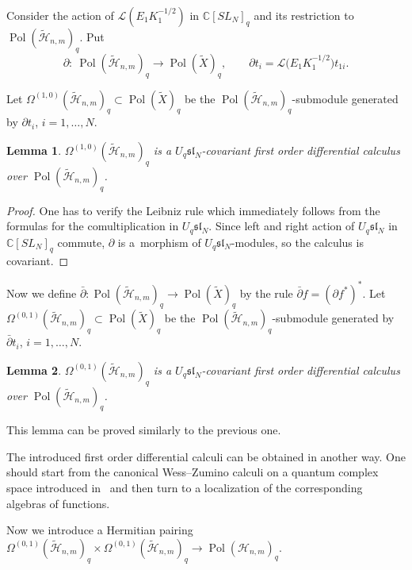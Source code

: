 \documentclass[11pt]{article}
\newtheorem{lemma}{Lemma}
\begin{document}
Consider the action of $\mathcal{L}(E_1K_1^{-1/2})$ in $\mathbb C [SL_N]_q$ and its restriction to
$\operatorname{Pol}(\widetilde{\mathscr{H}}_{n,m})_q$. Put
\[\partial: \
\operatorname{Pol}(\widetilde{\mathscr{H}}_{n,m})_q \rightarrow \operatorname{Pol}(\widetilde{X})_q, \qquad \partial
t_i=\mathcal{L}\big(E_1K_1^{-1/2}\big)t_{1i}.
\]

Let $\Omega^{(1,0)}(\widetilde{\mathscr{H}}_{n,m})_q \subset \operatorname{Pol}(\widetilde{X})_q$ be the
$\operatorname{Pol}(\widetilde{\mathscr{H}}_{n,m})_q$-submodule generated by $\partial t_i$, $i=1,\dots,N$.
\begin{lemma}
$\Omega^{(1,0)}(\widetilde{\mathscr{H}}_{n,m})_q$ is a $U_q \mathfrak{sl}_N$-covariant first order differential calculus
over $\operatorname{Pol}(\widetilde{\mathscr{H}}_{n,m})_q$.
\end{lemma}
\begin{proof} One has to verify the Leibniz rule  which immediately follows from the formulas for the
comultiplication in $U_q \mathfrak{sl}_N$. Since left and right action of $U_q \mathfrak{sl}_N$ in $\mathbb C
[SL_N]_q$ commute, $\partial$ is a~morphism of $U_q \mathfrak{sl}_N$-modules, so the calculus is covariant.
\end{proof}

Now we def\/ine $\bar{\partial}: \operatorname{Pol}(\widetilde{\mathscr{H}}_{n,m})_q \rightarrow
\operatorname{Pol}(\widetilde{X})_q$ by the rule $\bar{\partial}f=(\partial f^*)^*$. Let
$\Omega^{(0,1)}(\widetilde{\mathscr{H}}_{n,m})_q \subset \operatorname{Pol}(\widetilde{X})_q$ be the
$\operatorname{Pol}(\widetilde{\mathscr{H}}_{n,m})_q$-submodule generated by $\bar{\partial} t_i$, $i=1,\dots,N$.
\begin{lemma}
$\Omega^{(0,1)}(\widetilde{\mathscr{H}}_{n,m})_q$ is a $U_q \mathfrak{sl}_N$-covariant first order differential calculus
over $\operatorname{Pol}(\widetilde{\mathscr{H}}_{n,m})_q$.
\end{lemma}

This lemma can be proved similarly to the previous one.
\begin{remark}
The introduced f\/irst order dif\/ferential calculi can be obtained in another
way. One should start from the canonical Wess--Zumino calculi on a quantum
complex space introduced in~\cite{RTF} and then turn to a localization of
the corresponding algebras of functions.
\end{remark}



Now we introduce a Hermitian pairing $\Omega^{(0,1)}(\widetilde{\mathscr{H}}_{n,m})_q \times
\Omega^{(0,1)}(\widetilde{\mathscr{H}}_{n,m})_q \rightarrow \operatorname{Pol}({\mathscr{H}}_{n,m})_q$.
\end{document}
